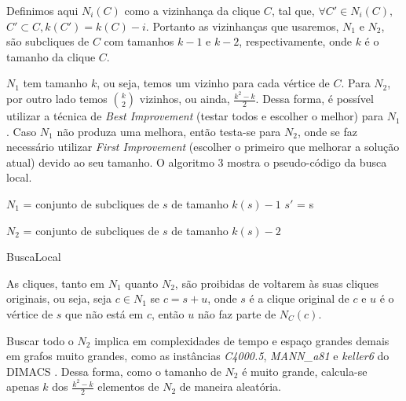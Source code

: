 \documentclass{article}
\begin{document}
Definimos aqui $N_i(C)$ como a vizinhança da clique $C$, tal que, $\forall C' \in N_i(C), $\\$C' \subset C,  k(C') = k(C)-i$. Portanto as vizinhanças que usaremos, $N_1$ e $N_2$, são subcliques de $C$ com tamanhos $k-1$ e $k-2$, respectivamente, onde $k$ é o tamanho da clique $C$.\par

$N_1$ tem tamanho $k$, ou seja, temos um vizinho para cada vértice de $C$. Para $N_2$, por outro lado temos $\binom{k}{2}$  vizinhos, ou ainda, $\frac{k^2 - k}{2}$. Dessa forma, é possível utilizar a técnica de \textit{Best Improvement} (testar todos e escolher o melhor) para $N_1$. Caso $N_1$ não produza uma melhora, então testa-se para $N_2$, onde se faz necessário utilizar \textit{First Improvement} (escolher o primeiro que melhorar a solução atual) devido ao seu tamanho. O algoritmo 3 mostra o pseudo-código da busca local.\par

\begin{algorithm}
 $N_1$ = conjunto de subcliques de $s$ de tamanho $k(s)-1$\;
 $s'$ = s\;
 


 $N_2$ = conjunto de subcliques de $s$ de tamanho $k(s)-2$\;


 \caption{BuscaLocal}
\end{algorithm}

As cliques, tanto em $N_1$ quanto $N_2$, são proibidas de voltarem às suas cliques originais, ou seja, seja $c \in N_1$ se $c = s + u$, onde $s$ é a clique original de $c$ e $u$ é o vértice de $s$ que não está em $c$, então $u$ não faz parte de $N_C(c)$.\par

 Buscar todo o $N_2$ implica em complexidades de tempo e espaço grandes demais em grafos muito grandes, como as instâncias \textit{C4000.5}, \textit{MANN\_a81} e \textit{keller6} do DIMACS \cite{DIMACS2}. Dessa forma, como o tamanho de $N_2$ é muito grande, calcula-se apenas $k$ dos $\frac{k^2-k}{2}$ elementos de $N_2$ de maneira aleatória.\par
\end{document}
